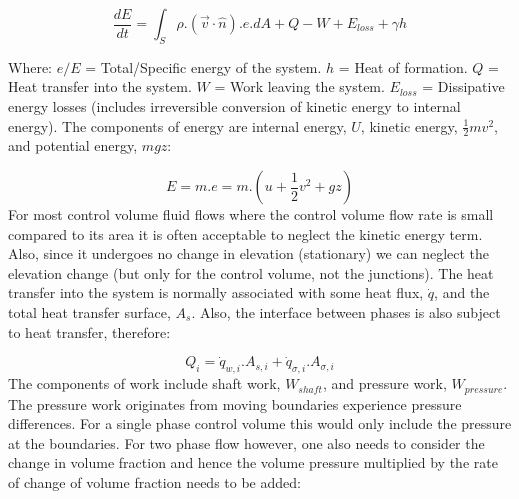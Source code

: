 \documentclass[11pt,letterpaper,titlepage]{article}
\newcommand{\half}{\frac{1}{2}}
\begin{document}
\begin{equation*}
\frac{dE}{dt}=\int_S \rho.(\vec{v}\cdot \hat{n}).e.dA + Q - W +E_{loss}+\gamma h
\end{equation*}

\noindent 
Where: 
\newline \noindent $e/E$ \quad = Total/Specific energy of the system.
\newline \noindent $h$ \quad = Heat of formation.
\newline \noindent $Q$ \quad = Heat transfer into the system.
\newline \noindent $W$ \quad = Work leaving the system.
\newline \noindent $E_{loss}$ \quad = Dissipative energy losses (includes irreversible conversion of kinetic energy to internal energy).
\newline
\newline
The components of energy are internal energy, $U$, kinetic energy, $\half mv^2$, and potential energy, $mgz$:

\begin{equation*}
E= m.e = m.(u+\half v^2+gz)
\end{equation*}
\newline
For most control volume fluid flows where the control volume flow rate is small compared to its area it is often acceptable to neglect the kinetic energy term. Also, since it undergoes no change in elevation (stationary) we can neglect the elevation change (but only for the control volume, not the junctions).
\newline
\newline
The heat transfer into the system is normally associated with some heat flux, $\dot{q}$, and the total heat transfer surface, $A_s$. Also, the interface between phases is also subject to heat transfer, therefore:

\begin{equation*}
Q_i=\dot{q}_{w,i}.A_{s,i}+\dot{q}_{\sigma ,i}.A_{\sigma,i}
\end{equation*}
\newline
The components of work include shaft work, $W_{shaft}$, and pressure work, $W_{pressure}$. The pressure work originates from moving boundaries experience pressure differences. For a single phase control volume this would only include the pressure at the boundaries. For two phase flow however, one also needs to consider the change in volume fraction and hence the volume pressure multiplied by the rate of change of volume fraction needs to be added:
\end{document}
